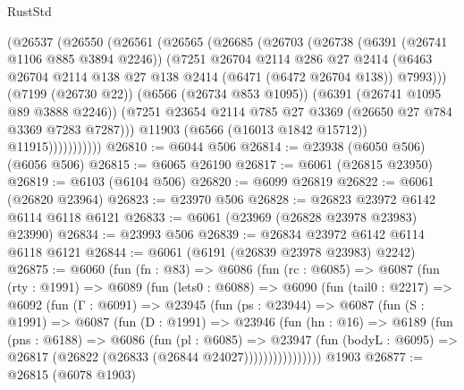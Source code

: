\begin{lexlean}{RustStd}
\begin{coremodule}
                (@26537
                  (@26550
                    (@26561
                      (@26565
                        (@26685
                          (@26703
                            (@26738
                              (@6391 (@26741 @1106 @885 @3894 @2246))
                              (@7251
                                @26704
                                @2114
                                @286
                                @27
                                @2414
                                (@6463
                                  @26704
                                  @2114
                                  @138
                                  @27
                                  @138
                                  @2414
                                  (@6471 (@6472 @26704 @138))
                                  @7993)))
                            (@7199 (@26730 @22))
                            (@6566 (@26734 @853 @1095))
                            (@6391 (@26741 @1095 @89 @3888 @2246))
                            (@7251 @23654 @2114 @785 @27 @3369 (@26650 @27 @784 @3369 @7283 @7287)))
                          @11903
                          (@6566 (@16013 @1842 @15712))
                          @11915)))))))))))
@26810 := @6044 @506
@26814 := @23938 (@6050 @506) (@6056 @506)
@26815 := @6065 @26190
@26817 := @6061 (@26815 @23950)
@26819 := @6103 (@6104 @506)
@26820 := @6099 @26819
@26822 := @6061 (@26820 @23964)
@26823 := @23970 @506
@26828 := @26823 @23972 @6142 @6114 @6118 @6121
@26833 := @6061 (@23969 (@26828 @23978 @23983) @23990)
@26834 := @23993 @506
@26839 := @26834 @23972 @6142 @6114 @6118 @6121
@26844 := @6061 (@6191 (@26839 @23978 @23983) @2242)
@26875 := @6060
    (fun (fn : @83) =>
    @6086
      (fun (rc : @6085) =>
      @6087
        (fun (rty : @1991) =>
        @6089
          (fun (lets0 : @6088) =>
          @6090
            (fun (tail0 : @2217) =>
            @6092
              (fun (Γ : @6091) =>
              @23945
                (fun (ps : @23944) =>
                @6087
                  (fun (S : @1991) =>
                  @6087
                    (fun (D : @1991) =>
                    @23946
                      (fun (hn : @16) =>
                      @6189
                        (fun (pns : @6188) =>
                        @6086
                          (fun (pl : @6085) =>
                          @23947
                            (fun (bodyL : @6095) =>
                            @26817 (@26822 (@26833 (@26844 @24027))))))))))))))))
    @1903
@26877 := @26815 (@6078 @1903)

\end{coremodule}
\end{lexlean}
